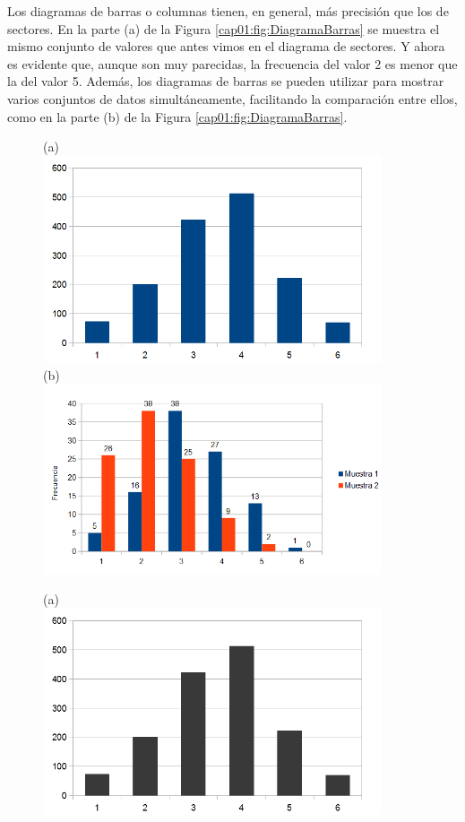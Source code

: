 Los  {\sf diagramas de barras o columnas} tienen,
  en general, más precisión que los de sectores. En la parte (a) de la Figura
  \ref{cap01:fig:DiagramaBarras} se muestra el mismo conjunto de valores que antes vimos en el diagrama de sectores. Y ahora es evidente que, aunque
  son muy parecidas, la frecuencia del valor 2 es menor que la del valor 5. Además, los diagramas de barras se pueden utilizar para  mostrar varios conjuntos de datos simultáneamente, facilitando la comparación entre ellos, como en la parte (b) de la Figura  \ref{cap01:fig:DiagramaBarras}.
  \begin{figure}[phtb]
	\begin{center}
	\begin{enColor}
    (a)\\
	\includegraphics[width=10cm]{../fig/Cap01-DiagramaBarrasconCalc.png}\\[3mm]
    (b)\\
    \includegraphics[width=10cm]{../fig/Cap01-DiagramaBarrasDosMuestras.png}\\[3mm]
	\end{enColor}
	\begin{bn}
    (a)\\
	\includegraphics[width=10cm]{../fig/Cap01-DiagramaBarrasconCalc-bn.png}\\[3mm]

\end{bn}
\end{center}
\end{figure}
